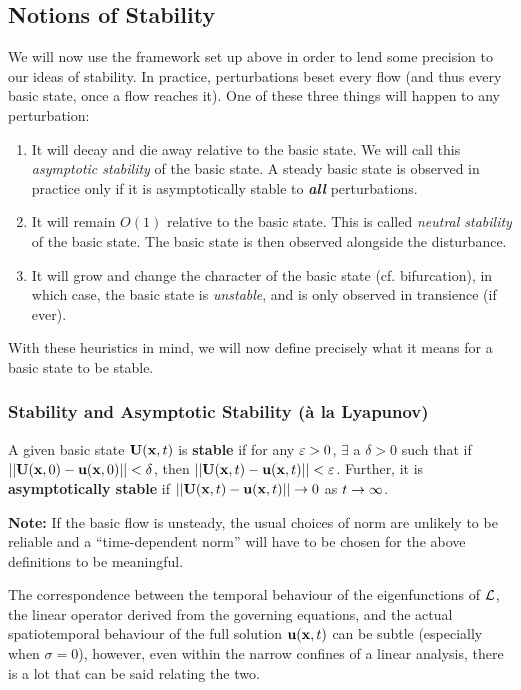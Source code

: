 \subsection{Notions of Stability}

We will now use the framework set up above in order to lend some precision to our ideas of stability. In practice, perturbations beset every flow (and thus every basic state, once a flow reaches it). One of these three things will happen to any perturbation: 
\begin{enumerate}
    \item It will decay and die away relative to the basic state. We will call this \emph{asymptotic stability} of the basic state. A steady basic state is observed in practice only if it is asymptotically stable to \textbf{\emph{all}} perturbations. 
    \item It will remain $O(1)$ relative to the basic state. This is called \emph{neutral stability} of the basic state. The basic state is then observed alongside the disturbance. 
    \item It will grow and change the character of the basic state (cf. bifurcation), in which case, the basic state is \emph{unstable}, and is only observed in transience (if ever).
\end{enumerate}
With these heuristics in mind, we will now define precisely what it means for a basic state to be stable. 
\subsubsection{Stability and Asymptotic Stability (\` a la Lyapunov)}
A given basic state ${\textbf{U}}({\textbf{x}}, t)$ is \textbf{stable} if for any $\varepsilon > 0$, $\exists$ a $\delta > 0$ such that if $||{\textbf{U}}({\textbf{x}}, 0) - {\textbf{u}}({\textbf{x}}, 0)|| < \delta$, then $||{\textbf{U}}({\textbf{x}}, t) - {\textbf{u}}({\textbf{x}}, t)|| < \varepsilon$. Further, it is \textbf{asymptotically stable} if $||{\textbf{U}}({\textbf{x}}, t) - {\textbf{u}}({\textbf{x}}, t)|| \rightarrow 0$ as $t \rightarrow \infty$. 

\textbf{Note:} If the basic flow is unsteady, the usual choices of norm are unlikely to be reliable and a ``time-dependent norm'' will have to be chosen for the above definitions to be meaningful. 

The correspondence between the temporal behaviour of the eigenfunctions of $\mathcal{L}$, the linear operator derived from the governing equations, and the actual spatiotemporal behaviour of the full solution ${\textbf{u}}({\textbf{x}}, t)$ can be subtle (especially when $\sigma = 0$), however, even within the narrow confines of a linear analysis, there is a lot that can be said relating the two. 

